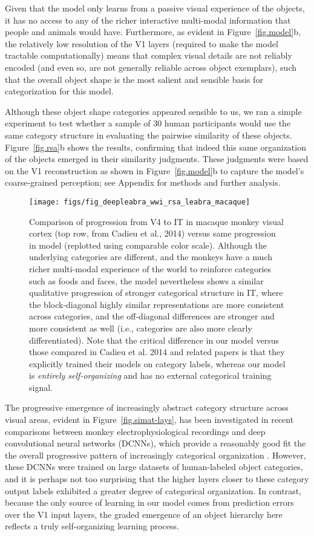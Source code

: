 \documentclass[11pt,twoside]{article}
\newif\myifpdf
\begin{document}
Given that the model only learns from a passive visual experience of the objects, it has no access to any of the richer interactive multi-modal information that people and animals would have.  Furthermore, as evident in Figure~\ref{fig.model}b, the relatively low resolution of the V1 layers (required to make the model tractable computationally) means that complex visual details are not reliably encoded (and even so, are not generally reliable across object exemplars), such that the overall object shape is the most salient and sensible basis for categorization for this model.

Although these object shape categories appeared sensible to us, we ran a simple experiment to test whether a sample of 30 human participants would use the same category structure in evaluating the pairwise similarity of these objects.  Figure~\ref{fig.rsa}b shows the results, confirming that indeed this same organization of the objects emerged in their similarity judgments.  These judgments were based on the V1 reconstruction as shown in Figure~\ref{fig.model}b to capture the model's coarse-grained perception; see Appendix for methods and further analysis.

\begin{figure}
  \centering\texttt{[image: figs/fig\_deepleabra\_wwi\_rsa\_leabra\_macaque]}
  \caption{\footnotesize Comparison of progression from V4 to IT in macaque monkey visual cortex (top row, from Cadieu et al., 2014) versus same progression in model (replotted using comparable color scale).  Although the underlying categories are different, and the monkeys have a much richer multi-modal experience of the world to reinforce categories such as foods and faces, the model nevertheless shows a similar qualitative progression of stronger categorical structure in IT, where the block-diagonal highly similar representations are more consistent across categories, and the off-diagonal differences are stronger and more consistent as well (i.e., categories are also more clearly differentiated).  Note that the critical difference in our model versus those compared in Cadieu et al. 2014 and related papers is that they explicitly trained their models on category labels, whereas our model is \emph{entirely self-organizing} and has no external categorical training signal.}
  \label{fig.macaque}
\end{figure}

The progressive emergence of increasingly abstract category structure across visual areas, evident in Figure~\ref{fig.simat-lays}, has been investigated in recent comparisons between monkey electrophysiological recordings and deep convolutional neural networks (DCNNs), which provide a reasonably good fit the the overall progressive pattern of increasingly categorical organization \citep{CadieuHongYaminsEtAl14}.  However, these DCNNs were trained on large datasets of human-labeled object categories, and it is perhaps not too surprising that the higher layers closer to these category output labels exhibited a greater degree of categorical organization.  In contrast, because the only source of learning in our model comes from prediction errors over the V1 input layers, the graded emergence of an object hierarchy here reflects a truly self-organizing learning process.
\end{document}
